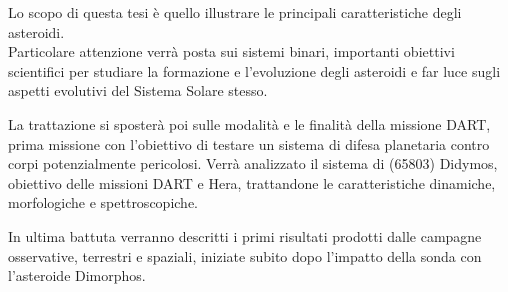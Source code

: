 \documentclass[a4paper,11pt,openright]{book}
\newenvironment{abstract}%
{\cleardoublepage%
\thispagestyle{empty}%
\null \vfill
\begin{center}%
\Huge \bfseries \abstractname 
\end{center}}%
{\vfill\null}
\begin{document}
\begin{frontespizio}

    
    
    
    
    
    
    {}
    
    
    
    
    
    
    
   
    
\end{frontespizio}



\frontmatter




\begin{abstract}    
Lo scopo di questa tesi è quello illustrare le principali caratteristiche degli asteroidi.\\
Particolare attenzione verrà posta sui sistemi binari, importanti obiettivi scientifici per studiare la formazione e l'evoluzione degli asteroidi e far luce sugli aspetti evolutivi del Sistema Solare stesso.

La trattazione si sposterà poi sulle modalità e le finalità della missione DART, prima missione con l'obiettivo di testare un sistema di difesa planetaria contro corpi potenzialmente pericolosi. Verrà analizzato il sistema di (65803) Didymos, obiettivo delle missioni DART e Hera, trattandone le caratteristiche dinamiche, morfologiche e spettroscopiche.

In ultima battuta verranno descritti i primi risultati prodotti dalle campagne osservative, terrestri e spaziali, iniziate subito dopo l'impatto della sonda con l'asteroide Dimorphos.



\end{abstract}
\end{document}
